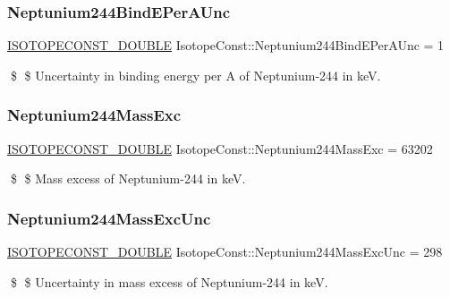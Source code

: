 \subsubsection{\texorpdfstring{Neptunium244\+Bind\+E\+Per\+A\+Unc}{Neptunium244BindEPerAUnc}}
{\footnotesize\ttfamily \mbox{\hyperlink{group___isotope_const-_macros_ga8f45a7272ce02c0b4c65c44636ed719a}{I\+S\+O\+T\+O\+P\+E\+C\+O\+N\+S\+T\+\_\+\+D\+O\+U\+B\+LE}} Isotope\+Const\+::\+Neptunium244\+Bind\+E\+Per\+A\+Unc = 1}

\$ \$ Uncertainty in binding energy per A of Neptunium-\/244 in keV. \mbox{\label{group___isotope_const-_neptunium-_np244_ga85831bd0d10517ed3c6dda74c0a9414d}} 
\subsubsection{\texorpdfstring{Neptunium244\+Mass\+Exc}{Neptunium244MassExc}}
{\footnotesize\ttfamily \mbox{\hyperlink{group___isotope_const-_macros_ga8f45a7272ce02c0b4c65c44636ed719a}{I\+S\+O\+T\+O\+P\+E\+C\+O\+N\+S\+T\+\_\+\+D\+O\+U\+B\+LE}} Isotope\+Const\+::\+Neptunium244\+Mass\+Exc = 63202}

\$ \$ Mass excess of Neptunium-\/244 in keV. \mbox{\label{group___isotope_const-_neptunium-_np244_gab3a8332a85fe60bad7b2f499d1e9bafa}} 
\subsubsection{\texorpdfstring{Neptunium244\+Mass\+Exc\+Unc}{Neptunium244MassExcUnc}}
{\footnotesize\ttfamily \mbox{\hyperlink{group___isotope_const-_macros_ga8f45a7272ce02c0b4c65c44636ed719a}{I\+S\+O\+T\+O\+P\+E\+C\+O\+N\+S\+T\+\_\+\+D\+O\+U\+B\+LE}} Isotope\+Const\+::\+Neptunium244\+Mass\+Exc\+Unc = 298}

\$ \$ Uncertainty in mass excess of Neptunium-\/244 in keV. \mbox{\label{group___isotope_const-_neptunium-_np244_gab2c276f0272c09db884b7ce8b5f31158}} 
